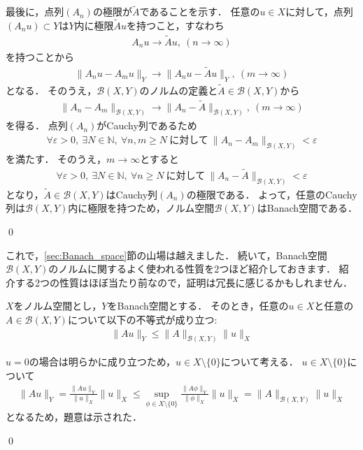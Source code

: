 \begin{Proof}
最後に，点列$(A_n)$の極限が$\tilde{A}$であることを示す．
任意の$u \in X$に対して，点列$(A_n u) \subset Y$は$Y$内に極限$\tilde{A} u$を持つこと，すなわち
\begin{align*}
A_n u \rightarrow \tilde{A} u, ~ (n \rightarrow \infty)
\end{align*}
を持つことから
\begin{align*}
 \| A_n u - A_m u \|_{Y} \rightarrow \| A_n u - \tilde{A} u \|_{Y}, ~ (m \rightarrow \infty)
\end{align*}
となる．
そのうえ，${\mathcal B}(X,Y)$のノルムの定義と$\tilde{A} \in {\mathcal B}(X, Y)$から
\begin{align*}
\| A_n - A_m \|_{{\mathcal B}(X,Y)}  \rightarrow \| A_n - \tilde{A} \|_{{\mathcal B}(X,Y)}, ~ (m \rightarrow \infty)
\end{align*}
を得る．
点列$(A_n)$がCauchy列であるため
\begin{align*}
  \forall \varepsilon > 0, ~ \exists N \in {\mathbb N}, ~ \forall n, m \ge N ~ \mbox{に対して} ~ \| A_n - A_m \|_{{\mathcal B}(X,Y)} < \varepsilon
\end{align*}
を満たす．
そのうえ，$m \rightarrow \infty$とすると
\begin{align*}
  \forall \varepsilon > 0, ~ \exists N \in {\mathbb N}, ~ \forall n \ge N ~ \mbox{に対して} ~ \| A_n - \tilde{A} \|_{{\mathcal B}(X,Y)} < \varepsilon
\end{align*}
となり，$\tilde{A} \in {\mathcal B}(X,Y)$はCauchy列$(A_n)$の極限である．
よって，任意のCauchy列は${\mathcal B}(X,Y)$内に極限を持つため，ノルム空間${\mathcal B}(X,Y)$はBanach空間である．

\qed
\end{Proof}

これで，\ref{sec:Banach_space}節の山場は越えました．
続いて，Banach空間${\mathcal B}(X,Y)$のノルムに関するよく使われる性質を2つほど紹介しておきます．
紹介する2つの性質はほぼ当たり前なので，証明は冗長に感じるかもしれません．

\begin{Thm}\label{thm:linear_operator_norm_prop1}
$X$をノルム空間とし，$Y$をBanach空間とする．
そのとき，任意の$u \in X$と任意の$A \in {\mathcal B}(X, Y)$について以下の不等式が成り立つ:
\begin{align*}
\| A u \|_{Y} \le \| A \|_{{\mathcal B}(X,Y)} \| u \|_{X}
\end{align*}
\end{Thm}

\begin{Proof}
$u = 0$の場合は明らかに成り立つため，$u \in X \setminus \{ 0 \}$について考える．
$u \in X \setminus \{ 0 \}$について
\begin{align*}
\| A u \|_{Y} = \frac{ \| A u \|_{Y} }{ \| u \|_{X} } \| u \|_{X} \le \sup_{\phi \in X \setminus \{ 0 \}} \frac{ \| A \phi \|_{Y} }{ \| \phi \|_{X} } \| u \|_{X} = \| A \|_{{\mathcal B}(X,Y)} \| u \|_{X}
\end{align*}
となるため，題意は示された．

\qed
\end{Proof}

